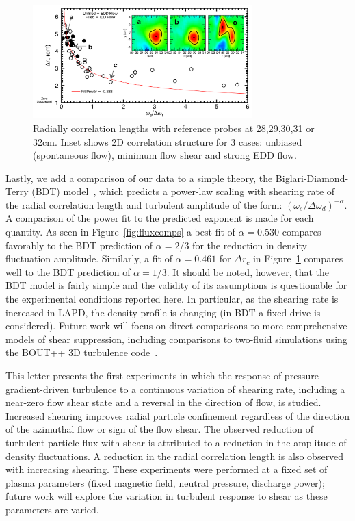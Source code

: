 \documentclass[aps,prl,amsmath,amssymb,preprint,superscriptaddress]{revtex4}
\begin{document}
\begin{figure}[!htbp]
\centerline{
\includegraphics[width=8.5cm]{radcorr}}
\caption{\label{fig:radcorr} Radially correlation lengths with
  reference probes at 28,29,30,31 or 32cm. Inset shows 2D correlation
  structure for 3 cases: unbiased (spontaneous flow), minimum flow
  shear and strong EDD flow.}
\end{figure}

Lastly, we add a comparison of our data to a simple theory, the
Biglari-Diamond-Terry (BDT) model~\cite{biglari90}, which predicts a
power-law scaling with shearing rate of the radial correlation length and turbulent
amplitude of the form: $\left(\omega_{s}/\Delta
\omega_{d}\right)^{-\alpha}$. A comparison of the power fit to the
predicted exponent is made for each quantity. As seen in
Figure~\ref{fig:fluxcomps} a best fit of $\alpha = 0.530$ compares
favorably to the BDT prediction of $\alpha = 2/3$ for the reduction in
density fluctuation amplitude. Similarly, a fit of $\alpha = 0.461$
for $\Delta r_{c}$ in Figure~\ref{fig:radcorr} compares well to the BDT
prediction of $\alpha = 1/3$.   It should be noted, however, that the
BDT model is fairly simple and the validity of its assumptions is
questionable for the experimental conditions reported here.  In
particular, as the shearing rate is increased in LAPD, the density
profile is changing (in BDT a fixed drive is considered).  Future work
will focus on direct comparisons to more comprehensive models of shear
suppression, including comparisons to two-fluid simulations using the
BOUT++ 3D turbulence code~\cite{umansky11}.  

This letter presents the first experiments in which the response of
pressure-gradient-driven turbulence to a continuous
variation of shearing rate, including a near-zero flow shear state and
a reversal in the direction of flow, is studied.  Increased shearing
improves radial particle confinement regardless of the direction of
the azimuthal flow or sign of the flow shear. The observed reduction of
turbulent particle flux with shear is attributed to a reduction in the
amplitude of density fluctuations.  A reduction in the radial
correlation length is also observed with increasing shearing. These
experiments were performed at a fixed set of plasma parameters (fixed
magnetic field, neutral pressure, discharge power); future work will
explore the variation in turbulent response to shear as these
parameters are varied.  
\end{document}
